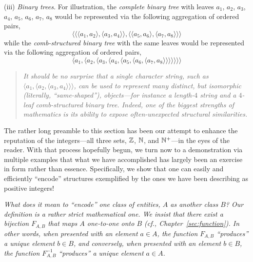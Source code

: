 \noindent
(iii) {\em Binary trees.}
%
For illustration, the {\em complete binary tree}
with leaves $a_1$, $a_2$, $a_3$, $a_4$, $a_5$, $a_6$, $a_7$, $a_8$
would be represented via the following aggregation of ordered pairs,
\[
\langle
\langle \langle a_1,  a_2 \rangle, \langle a_3,  a_4 \rangle \rangle,
\langle \langle a_5,  a_6 \rangle, \langle a_7,  a_8 \rangle \rangle
\rangle
\]
while the {\em comb-structured binary tree}
with the same leaves would be represented via the following
aggregation of ordered pairs,
\[
\langle a_1, \langle a_2, \langle a_3, \langle a_4, \langle a_5,
\langle a_6, \langle a_7, a_8 \rangle \rangle \rangle \rangle
\rangle \rangle \rangle
\]
\begin{quote}
{\em It should be no surprise that a single character string, such as
  $\langle a_1, \langle a_2, \langle a_3, a_4 \rangle \rangle
  \rangle$, can be used to represent many distinct, but {\em
    isomorphic} (literally, ``same-shaped''), objects---for instance a
  length-$4$ string and a $4$-leaf comb-structured binary tree.
  Indeed, one of the biggest strengths of mathematics is its ability
  to expose often-unexpected structural similarities.  }
\end{quote}

\medskip

The rather long preamble to this section has been our attempt to
enhance the reputation of the integers---all three sets, $\mathbb{Z}$, $\mathbb{N}$,
and $\mathbb{N}^+$---in the eyes of the reader.  With that process hopefully
begun, we turn now to a demonstration via multiple examples that what
we have accomplished has largely been an exercise in form rather than
essence.  Specifically, we show that one can easily and efficiently
``encode'' structures exemplified by the ones we have been describing
as positive integers!

\medskip

\noindent
{\em What does it mean to ``encode'' one class of
  entities, $A$ as another class $B$?  Our definition is a rather
  strict mathematical one.  We insist that there exist a {\em
    bijection} $F_{A,B}$ that maps $A$ {\em one-to-one onto} $B$ (cf.,
  Chapter~\ref{sec:function}).  In other words, when presented with an
  element $a \in A$, the function $F_{A,B}$ ``produces'' a unique
  element $b \in B$, and conversely, when presented with an element $b
  \in B$, the function $F^{-1}_{A,B}$ ``produces'' a unique element $a
  \in A$.}

